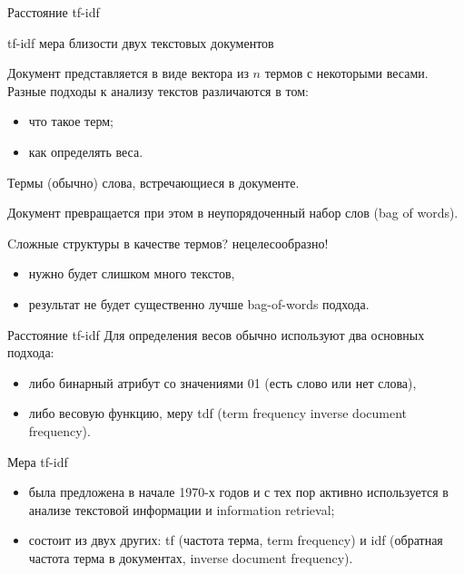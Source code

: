 \documentclass{beamer}
\begin{document}
\begin{frame}{Расстояние tf-idf}
\begin{block}{tf-idf}
мера близости двух текстовых документов
\end{block}
Документ представляется в виде вектора из $n$ термов с некоторыми весами. Разные подходы к анализу текстов различаются в том:  
\begin{itemize}
\item что такое терм;
\item как определять веса.
\end{itemize}
\begin{block}{Термы}
(обычно) слова, встречающиеся в документе. 
\end{block}
Документ превращается при этом в неупорядоченный набор слов (bag of words).

Cложные структуры в качестве термов? нецелесообразно!
\begin{itemize}
\item нужно будет слишком много текстов, 
\item результат не будет существенно лучше bag-of-words подхода.
\end{itemize}  
\end{frame}

\begin{frame}{Расстояние tf-idf}
Для определения весов обычно используют два основных подхода:
\begin{itemize}
\item либо бинарный атрибут со значениями 01 (есть слово или нет слова),
\item либо весовую функцию, меру tdf (term frequency  inverse document frequency).
\end{itemize}  

\begin{block}{Мера tf-idf}
\begin{itemize}
\item была предложена в начале 1970-х годов и с тех пор активно используется в анализе текстовой информации и information retrieval;
\item состоит из двух других: tf (частота терма, term frequency) и idf (обратная частота
терма в документах, inverse document frequency).
\end{itemize}
\end{block}
\end{frame}
\end{document}
